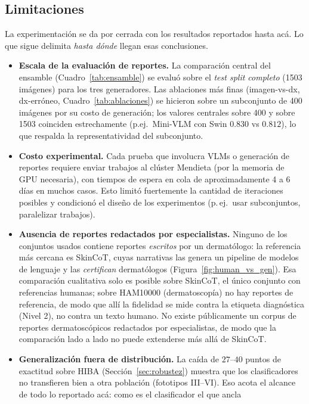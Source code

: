 \documentclass[11pt, a4paper]{article}
\begin{document}
\subsection{Limitaciones}
\label{sec:limitaciones}
La experimentación se da por cerrada con los resultados reportados hasta acá. Lo que sigue delimita
\emph{hasta dónde} llegan esas conclusiones.
\begin{itemize}[leftmargin=1.6em]
  \item \textbf{Escala de la evaluación de reportes.} La comparación central del ensamble
  (Cuadro~\ref{tab:ensamble}) se evaluó sobre el \emph{test split completo} (1503 imágenes) para los tres
  generadores. Las ablaciones más finas (imagen-vs-dx, dx-erróneo, Cuadro~\ref{tab:ablaciones}) se hicieron
  sobre un subconjunto de 400 imágenes por su costo de generación; los valores centrales sobre 400 y sobre
  1503 coinciden estrechamente (p.ej.\ Mini-VLM con Swin $0.830$ vs $0.812$), lo que respalda la
  representatividad del subconjunto.
  \item \textbf{Costo experimental.} Cada prueba que involucra VLMs o generación de reportes requiere
  enviar trabajos al clúster Mendieta (por la memoria de GPU necesaria), con tiempos de espera en cola
  de aproximadamente 4 a 6 días en muchos casos. Esto limitó fuertemente la cantidad de iteraciones posibles
  y condicionó el diseño de los experimentos (p.\,ej.\ usar subconjuntos, paralelizar trabajos).
  \item \textbf{Ausencia de reportes redactados por especialistas.} Ninguno de los conjuntos usados
  contiene reportes \emph{escritos} por un dermatólogo: la referencia más cercana es SkinCoT, cuyas
  narrativas las genera un pipeline de modelos de lenguaje y las \emph{certifican} dermatólogos
  (Figura~\ref{fig:human_vs_gen}). Esa comparación cualitativa solo es posible sobre SkinCoT,
  el único conjunto con referencias humanas; sobre HAM10000 (dermatoscopía) no hay reportes de referencia,
  de modo que allí la fidelidad se mide contra la etiqueta diagnóstica (Nivel 2), no contra un texto
  humano. No existe públicamente un corpus de reportes dermatoscópicos redactados por especialistas, de
  modo que la comparación lado a lado no puede extenderse más allá de SkinCoT.
  \item \textbf{Generalización fuera de distribución.} La caída de $27$--$40$ puntos de exactitud sobre
  HIBA (Sección~\ref{sec:robustez}) muestra que los clasificadores no transfieren bien a otra población
  (fototipos III--VI). Eso acota el alcance de todo lo reportado acá: como es el clasificador el que ancla

\end{itemize}
\end{document}
